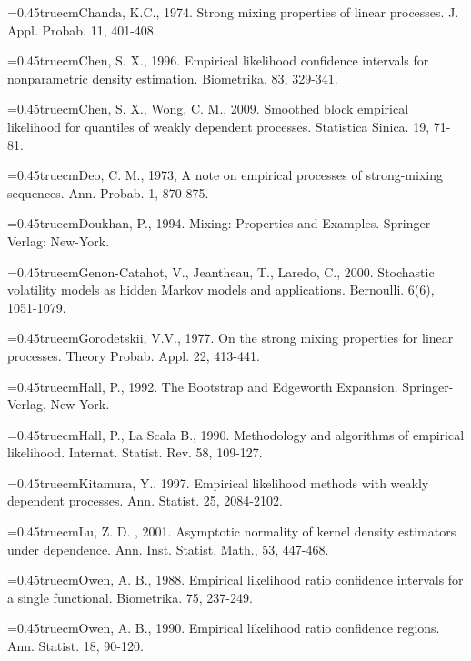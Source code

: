 \documentclass[12pt]{article}
\def\nh{\noindent\hangindent=0.45truecm\hangafter=1}
\begin{document}
\noindent

\nh Chanda, K.C., 1974. Strong mixing properties of linear processes. J. Appl. Probab. 11, 401-408.

\nh   Chen, S. X., 1996. Empirical likelihood confidence intervals for nonparametric density estimation.
Biometrika.  83, 329-341.

\nh Chen, S. X.,  Wong, C. M., 2009.  Smoothed block empirical likelihood for quantiles of
weakly dependent processes.  Statistica Sinica.  19, 71-81.

\nh Deo,  C.  M.,  1973, A  note on empirical processes of strong-mixing sequences. Ann. Probab.
1, 870-875.

\nh Doukhan, P., 1994. Mixing: Properties and Examples. Springer-Verlag: New-York.

\nh Genon-Catahot, V., Jeantheau, T., Laredo, C., 2000. Stochastic volatility models as hidden Markov models and applications. Bernoulli. 6(6), 1051-1079.

\nh Gorodetskii, V.V., 1977. On the strong mixing properties for linear processes. Theory Probab. Appl. 22, 413-441.


\nh  Hall, P., 1992.   The Bootstrap and Edgeworth Expansion.
Springer-Verlag, New York.

\nh  Hall, P., La Scala B., 1990. Methodology and algorithms of empirical likelihood.
Internat. Statist. Rev. 58, 109-127.

\nh   Kitamura, Y., 1997. Empirical likelihood methods with weakly
dependent processes. Ann. Statist.  25, 2084-2102.



\nh Lu, Z. D. , 2001. Asymptotic normality of kernel density estimators under dependence.  Ann.  Inst. Statist.  Math.,  53, 447-468.

\nh  Owen, A. B., 1988.  Empirical likelihood ratio confidence intervals for a single functional.
 Biometrika. 75, 237-249.

\nh  Owen, A. B., 1990. Empirical likelihood ratio confidence regions.
Ann. Statist. 18, 90-120.

\end{document}
